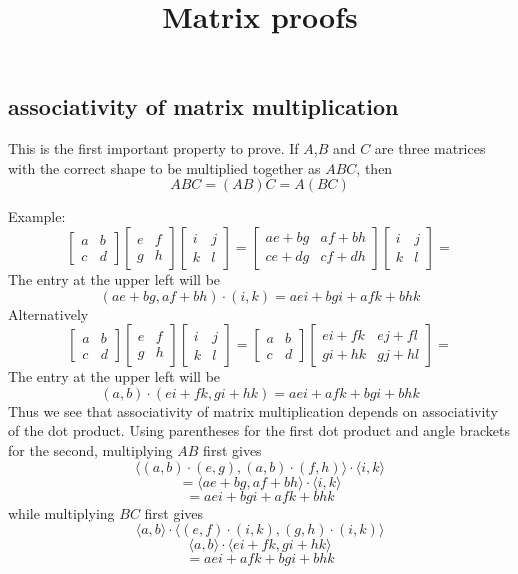 \documentclass[11pt, oneside]{article}   	%
\title{Matrix proofs}
\date{}							%
\begin{document}
\maketitle
\Large
\noindent
\subsection*{associativity of matrix multiplication}
This is the first important property to prove.  If $A$,$B$ and $C$ are three matrices with the correct shape to be multiplied together as $ABC$, then 
\[ ABC = (AB)C = A(BC) \]

Example:
\[
\begin{bmatrix}
a & b \\
c & d 
\end{bmatrix}
\begin{bmatrix}
e & f \\
g & h 
\end{bmatrix}
\begin{bmatrix}
i & j\\
k & l 
\end{bmatrix}
=
\begin{bmatrix}
ae + bg & af + bh \\
ce + dg & cf + dh 
\end{bmatrix}
\begin{bmatrix}
i & j\\
k & l 
\end{bmatrix}
=
\]
The entry at the upper left will be 
\[ (ae + bg, af + bh) \cdot (i,k) = aei + bgi + afk + bhk \]
Alternatively
\[
\begin{bmatrix}
a & b \\
c & d 
\end{bmatrix}
\begin{bmatrix}
e & f \\
g & h 
\end{bmatrix}
\begin{bmatrix}
i & j\\
k & l 
\end{bmatrix}
=
\begin{bmatrix}
a & b\\
c & d
\end{bmatrix}
\begin{bmatrix}
ei + fk & ej + fl \\
gi + hk & gj + hl 
\end{bmatrix}
=
\]
The entry at the upper left will be 
\[ (a,b) \cdot (ei + fk, gi + hk) = aei + afk + bgi + bhk \]
Thus we see that associativity of matrix multiplication depends on associativity of the dot product.  Using parentheses for the first dot product and angle brackets for the second, multiplying $AB$ first gives
\[ \langle (a,b) \cdot (e,g), (a,b) \cdot (f,h)\rangle \cdot \langle i,k \rangle \]
\[ = \langle ae + bg, af + bh \rangle \cdot \langle i, k \rangle \]
\[ = aei + bgi + afk + bhk \]
while multiplying $BC$ first gives 
\[ \langle a,b \rangle \cdot \langle (e,f) \cdot (i,k), (g,h) \cdot (i,k) \rangle  \]
\[ \langle a,b \rangle \cdot \langle ei + fk, gi + hk \rangle \]
\[ = aei + afk + bgi  + bhk \]
\end{document}
